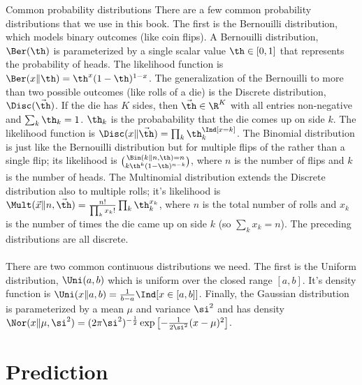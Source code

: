 \begin{mathreview}{Common probability distributions}
  There are a few common probability distributions that we use in this book.
  The first is the Bernouilli distribution, which models binary outcomes (like coin flips).
  A Bernouilli distribution, $\Ber(\th)$ is parameterized by a single scalar value $\th \in [0,1]$ that represents the probability of heads. The likelihood function is $\Ber(x \| \th) = \th^x (1-\th)^{1-x}$.
  The generalization of the Bernouilli to more than two possible outcomes (like rolls of a die) is the Discrete distribution, $\Disc(\vec \th)$. If the die has $K$ sides, then $\vec \th \in \R^K$ with all entries non-negative and $\sum_k \th_k = 1$. $\th_k$ is the probabability that the die comes up on side $k$. The likelihood function is $\Disc(x \| \vec\th) = \prod_k \th_k^{\Ind[x=k]}$.
  The Binomial distribution is just like the Bernouilli distribution but for multiple flips of the rather than a single flip; its likelihood is $\Bin(k \| n, \th) = n \choose k \th^k (1-\th)^{n-k}$, where $n$ is the number of flips and $k$ is the number of heads.
  The Multinomial distribution extends the Discrete distribution also to multiple rolls; it's likelihood is $\Mult(\vec x \| n, \vec\th) = \frac {n!} {\prod_k x_k!} \prod_k \th_k^{x_k}$, where $n$ is the total number of rolls and $x_k$ is the number of times the die came up on side $k$ (so $\sum_k x_k = n$).
  The preceding distributions are all discrete.
  ~\\~\\
  There are two common continuous distributions we need. The first is the Uniform distribution, $\Uni(a,b)$ which is uniform over the closed range $[a,b]$. It's density function is $\Uni(x \| a,b) = \frac 1 {b-a} \Ind[x \in [a,b]]$.
  Finally, the Gaussian distribution is parameterized by a mean $\mu$ and variance $\si^2$ and has density $\Nor(x \| \mu,\si^2) = (2 \pi \si^2)^{-\frac 1 2} \exp\left[ - \frac 1 {2 \si^2} (x-\mu)^2\right]$.
\end{mathreview}


\section{Prediction}

